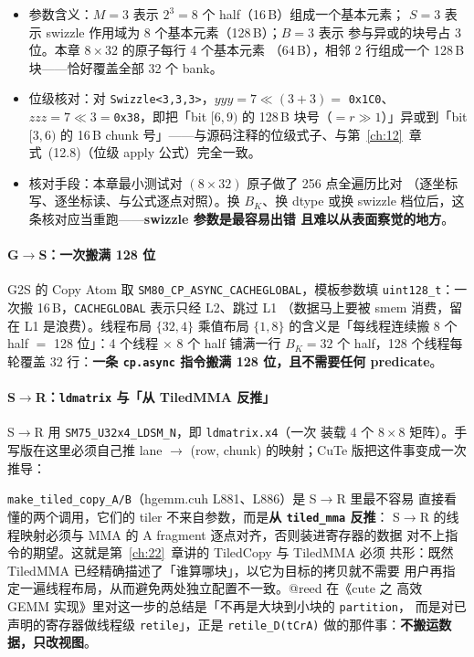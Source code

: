 \begin{itemize}
  \item 参数含义：$M=3$ 表示 $2^3=8$ 个 half（16\,B）组成一个基本元素；
        $S=3$ 表示 swizzle 作用域为 8 个基本元素（128\,B）；$B=3$ 表示
        参与异或的块号占 3 位。本章 $8\times32$ 的原子每行 4 个基本元素
        （64\,B），相邻 2 行组成一个 128\,B 块——恰好覆盖全部 32 个 bank。
  \item 位级核对：对 \texttt{Swizzle\allowbreak{}<3,\allowbreak{}3,\allowbreak{}3>}，$\mathit{yyy}=7\ll(3+3)=$
        \texttt{0x1C0}、$\mathit{zzz}=7\ll3=$\texttt{0x38}，即把「bit
        $[6,9)$ 的 128\,B 块号（$=r\gg1$）」异或到「bit $[3,6)$ 的
        16\,B chunk 号」——与源码注释的位级式子、与第~\ref{ch:12}~章
        式~(12.8)（位级 apply 公式）完全一致。
  \item 核对手段：本章最小测试对 $(8\times32)$ 原子做了 256 点全遍历比对
        （逐坐标写、逐坐标读、与公式逐点对照）。换 $B_K$、换 dtype 或换
        swizzle 档位后，这条核对应当重跑——\textbf{swizzle 参数是最容易出错
        且难以从表面察觉的地方}。
\end{itemize}

\paragraph{G$\to$S：一次搬满 128 位}

G2S 的 Copy Atom 取
\texttt{SM80\_\allowbreak{}CP\_\allowbreak{}ASYNC\_\allowbreak{}}\allowbreak\texttt{CACHEGLOBAL}，模板参数填
\texttt{uint128\_t}：一次搬 16\,B，\texttt{CACHEGLOBAL} 表示只经 L2、跳过 L1
（数据马上要被 smem 消费，留在 L1 是浪费）。线程布局 $\{32,4\}$ 乘值布局
$\{1,8\}$ 的含义是「每线程连续搬 8 个 half $=$ 128 位」：4 个线程 $\times$ 8 个
half 铺满一行 $B_K=32$ 个 half，128 个线程每轮覆盖 32 行：\textbf{一条
\texttt{cp.async} 指令搬满 128 位，且不需要任何 predicate}。

\paragraph{S$\to$R：\texttt{ldmatrix} 与「从 TiledMMA 反推」}

S$\to$R 用 \texttt{SM75\_\allowbreak{}U32x4\_\allowbreak{}LDSM\_\allowbreak{}N}，即 \texttt{ldmatrix.x4}（一次
装载 4 个 $8\times8$ 矩阵）。手写版在这里必须自己推 lane $\to$ (row, chunk)
的映射；CuTe 版把这件事变成一次推导：

\texttt{make\_\allowbreak{}tiled\_\allowbreak{}copy\_\allowbreak{}A/\allowbreak{}B}（hgemm.cuh L881、L886）是 S$\to$R 里最不容易
直接看懂的两个调用，它们的 tiler 不来自参数，而是\textbf{从 \texttt{tiled\_mma} 反推}：
S$\to$R 的线程映射必须与 MMA 的 A fragment 逐点对齐，否则装进寄存器的数据
对不上指令的期望。这就是第~\ref{ch:22}~章讲的 TiledCopy 与 TiledMMA 必须
共形：既然 TiledMMA 已经精确描述了「谁算哪块」，以它为目标的拷贝就不需要
用户再指定一遍线程布局，从而避免两处独立配置不一致。@reed 在《cute 之 高效
GEMM 实现》里对这一步的总结是「不再是大块到小块的 \texttt{partition}，
而是对已声明的寄存器做线程级 \texttt{retile}」，正是
\texttt{retile\_\allowbreak{}D\allowbreak{}(t\allowbreak{}Cr\allowbreak{}A)} 做的那件事：\textbf{不搬运数据，只改视图}。

